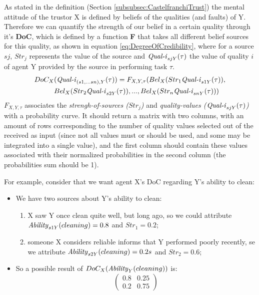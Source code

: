 As stated in the definition (Section \ref{subsubsec:CastelfranchiTrust}) the mental attitude of the trustor X is defined by beliefs of the qualities (and faults) of Y. Therefore we can quantify the strength of our belief in a certain quality through it's \textbf{\ac{DoC}}, which is defined by a function \textbf{F} that takes all different belief sources for this quality, as shown in equation \ref{eq:DegreeOfCredibility}, where for a source $sj$, $Str_j$ represents the value of the source and $\text{\textit{Qual-i}}_{sjY}(\tau)$ the value of quality $i$ of agent Y provided by the source in performing task $\tau$. 
\begin{equation}
	\begin {aligned}
	DoC_X&(\text{\textit{Qual-i}}_{(s1, ...sn), Y} (\tau)) = F_{X, Y, \tau} (Bel_X(Str_1 \text{\textit{Qual-i}}_{s1Y}(\tau)), \\
		 &Bel_X(Str_2 \text{\textit{Qual-i}}_{s2Y}(\tau)), ..., Bel_X(Str_n \text{\textit{Qual-i}}_{snY}(\tau))) \\
	\end {aligned}
	\label{eq:DegreeOfCredibility}
\end{equation}
$F_{X, Y, \tau}$ associates the \textit{strengh-of-sources ($Str_j$)} and \textit{quality-values ($\text{\textit{Qual-i}}_{sjY}(\tau)$)} with a probability curve. It should return a matrix with two columns, with an amount of rows corresponding to the number of quality values selected out of the received as input (since not all values must or should be used, and some may be integrated into a single value), and the first column should contain these values associated with their normalized probabilities in the second column (the probabilities sum should be 1). 

For example, consider that we want agent X's \ac{DoC} regarding Y's ability to clean:
\begin{itemize}
	\item We have two sources about Y's ability to clean:
	\begin{enumerate}
		\item X saw Y once clean quite well, but long ago, so we could attribute $\text{\textit{Ability}}_{s1Y}(cleaning) = 0.8$ and $Str_1=0.2$;
		\item someone X considers reliable informs that Y performed poorly recently, se we attribute
		$\text{\textit{Ability}}_{s2Y}(cleaning) = 0.2s$ and $Str_2=0.6$;
	\end{enumerate}
	\item So a possible result of $DoC_X(\text{\textit{Ability}}_Y (cleaning))$ is:
	$$\begin{pmatrix}
		0.8 & 0.25 \\
		0.2 & 0.75
	\end{pmatrix}$$
\end{itemize} 
	

